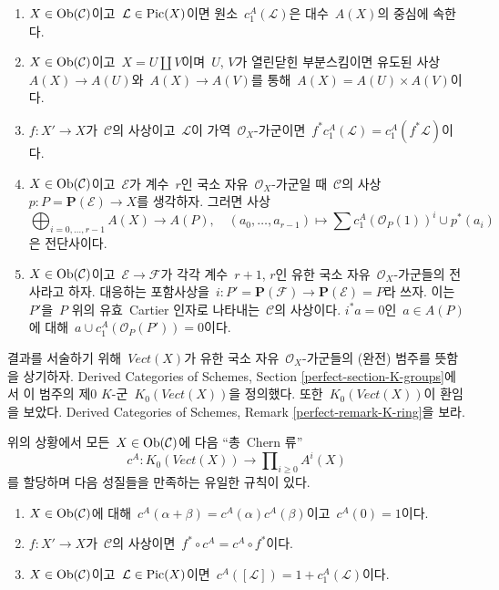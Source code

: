 \begin{enumerate}
\item $X \in \mathop{\mathrm{Ob}}\nolimits(\mathcal{C})$이고\  $\mathcal{L} \in \mathop{\mathrm{Pic}}\nolimits(X)$이면
원소\  $c_1^A(\mathcal{L})$은 대수\  $A(X)$의 중심에 속한다.
\item $X \in \mathop{\mathrm{Ob}}\nolimits(\mathcal{C})$이고\  $X = U \amalg V$이며\  $U$, $V$가
열린닫힌 부분스킴이면 유도된 사상\  $A(X) \to A(U)$와\ 
$A(X) \to A(V)$를 통해\  $A(X) = A(U) \times A(V)$이다.
\item $f : X' \to X$가\  $\mathcal{C}$의 사상이고\  $\mathcal{L}$이
가역\  $\mathcal{O}_X$-가군이면\  $f^*c_1^A(\mathcal{L}) =
c_1^A(f^*\mathcal{L})$이다.
\item $X \in \mathop{\mathrm{Ob}}\nolimits(\mathcal{C})$이고\  $\mathcal{E}$가 계수\  $r$인 국소
자유\  $\mathcal{O}_X$-가군일 때\  $\mathcal{C}$의 사상\ 
$p : P = \mathbf{P}(\mathcal{E}) \to X$를 생각하자. 그러면 사상
$$
\bigoplus\nolimits_{i = 0, \ldots, r - 1} A(X)
\longrightarrow A(P),\quad
(a_0, \ldots, a_{r - 1}) \longmapsto
\sum c_1^A(\mathcal{O}_P(1))^i \cup p^*(a_i)
$$
은 전단사이다.
\item $X \in \mathop{\mathrm{Ob}}\nolimits(\mathcal{C})$이고\  $\mathcal{E} \to \mathcal{F}$가
각각 계수\  $r + 1$, $r$인 유한 국소 자유\  $\mathcal{O}_X$-가군들의
전사라고 하자. 대응하는 포함사상을\ 
$i : P' = \mathbf{P}(\mathcal{F}) \to \mathbf{P}(\mathcal{E}) = P$라
쓰자. 이는\  $P'$을\  $P$ 위의 유효\  Cartier 인자로 나타내는\ 
$\mathcal{C}$의 사상이다. $i^*a = 0$인\  $a \in A(P)$에 대해\ 
$a \cup c_1^A(\mathcal{O}_P(P')) = 0$이다.
\end{enumerate}
결과를 서술하기 위해\  $\textit{Vect}(X)$가 유한 국소 자유\ 
$\mathcal{O}_X$-가군들의 (완전) 범주를 뜻함을 상기하자. Derived
Categories of Schemes, Section \ref{perfect-section-K-groups}에서 이
범주의 제0 $K$-군\  $K_0(\textit{Vect}(X))$을 정의했다. 또한\ 
$K_0(\textit{Vect}(X))$이 환임을 보았다. Derived Categories of
Schemes, Remark \ref{perfect-remark-K-ring}을 보라.

\begin{proposition}
\label{proposition-chern-class}
위의 상황에서 모든\  $X \in \mathop{\mathrm{Ob}}\nolimits(\mathcal{C})$에 다음 “총\  Chern 류”
$$
c^A : K_0(\textit{Vect}(X)) \longrightarrow  \prod\nolimits_{i \geq 0} A^i(X)
$$
를 할당하며 다음 성질들을 만족하는 유일한 규칙이 있다.
\begin{enumerate}
\item $X \in \mathop{\mathrm{Ob}}\nolimits(\mathcal{C})$에 대해\ 
$c^A(\alpha + \beta) = c^A(\alpha) c^A(\beta)$이고\ 
$c^A(0) = 1$이다.
\item $f : X' \to X$가\  $\mathcal{C}$의 사상이면\ 
$f^* \circ c^A =  c^A \circ f^*$이다.
\item $X \in \mathop{\mathrm{Ob}}\nolimits(\mathcal{C})$이고\  $\mathcal{L} \in \mathop{\mathrm{Pic}}\nolimits(X)$이면\ 
$c^A([\mathcal{L}]) = 1 + c_1^A(\mathcal{L})$이다.
\end{enumerate}
\end{proposition}

